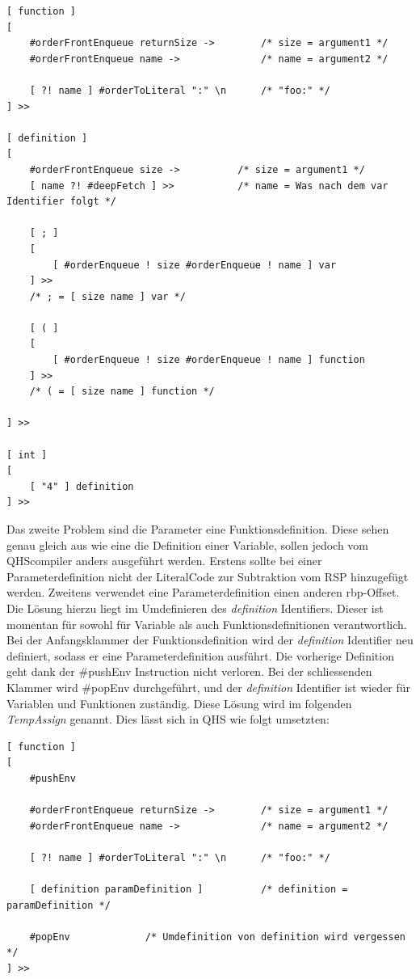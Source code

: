 \begin{minipage}{\linewidth}
\begin{lstlisting}[language=QHS, caption=Implementation eines DelayedExecute für Definitionen]
[ function ]
[
    #orderFrontEnqueue returnSize ->        /* size = argument1 */
    #orderFrontEnqueue name ->              /* name = argument2 */

    [ ?! name ] #orderToLiteral ":" \n      /* "foo:" */
] >>

[ definition ]
[
    #orderFrontEnqueue size ->          /* size = argument1 */
    [ name ?! #deepFetch ] >>           /* name = Was nach dem var Identifier folgt */

    [ ; ]
    [
        [ #orderEnqueue ! size #orderEnqueue ! name ] var 
    ] >>
    /* ; = [ size name ] var */

    [ ( ]
    [
        [ #orderEnqueue ! size #orderEnqueue ! name ] function 
    ] >>
    /* ( = [ size name ] function */

] >>

[ int ]
[
    [ "4" ] definition
] >>
\end{lstlisting}
\end{minipage}


Das zweite Problem sind die Parameter eine Funktionsdefinition. Diese sehen genau gleich aus wie eine die Definition einer Variable, sollen jedoch vom QHScompiler anders ausgeführt werden.
Erstens sollte bei einer Parameterdefinition nicht der LiteralCode zur Subtraktion vom RSP hinzugefügt werden. Zweitens verwendet eine Parameterdefinition einen anderen rbp-Offset.
Die Lösung hierzu liegt im Umdefinieren des \textit{definition} Identifiers. Dieser ist momentan für sowohl für Variable als auch Funktionsdefinitionen verantwortlich.
Bei der Anfangsklammer der Funktionsdefinition wird der \textit{definition} Identifier neu definiert, sodass er eine Parameterdefinition ausführt. Die vorherige Definition geht dank der \#pushEnv Instruction nicht verloren.
Bei der schliessenden Klammer wird \#popEnv durchgeführt, und der \textit{definition} Identifier ist wieder für Variablen und Funktionen zuständig. Diese Lösung wird im folgenden \textit{TempAssign} genannt.
Dies lässt sich in QHS wie folgt umsetzten:

\begin{minipage}{\linewidth}
\begin{lstlisting}[language=QHS, caption=Implementation eines TempAssigns für Parameter Definitionen]
[ function ]
[
    #pushEnv

    #orderFrontEnqueue returnSize ->        /* size = argument1 */
    #orderFrontEnqueue name ->              /* name = argument2 */

    [ ?! name ] #orderToLiteral ":" \n      /* "foo:" */

    [ definition paramDefinition ]          /* definition = paramDefinition */

    #popEnv             /* Umdefinition von definition wird vergessen */
] >>
\end{lstlisting}
\end{minipage}

